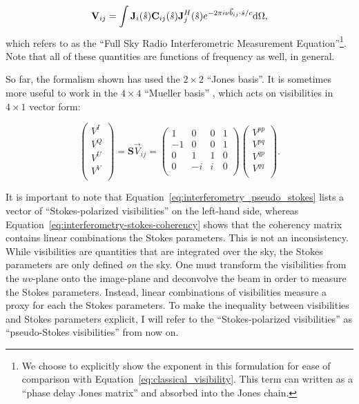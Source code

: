 \begin{equation}
\textbf{V}_{ij} = \int \textbf{J}_i(\hat{s}) \textbf{C}_{ij}(\hat{s}) \textbf{J}_j^H(\hat{s}) e^{-2\pi i \nu \vec{b}_{ij}\cdot\hat{s}/c} {\rm d}\Omega,
\label{eq:RIME}
\end{equation}
which \cite{Smirnov.11} refers to as the ``Full Sky Radio Interferometric Measurement Equation''\footnote{We choose to explicitly show the exponent in this formulation for ease of comparison with Equation~\ref{eq:classical_visibility}. This term can written as a ``phase delay Jones matrix'' and absorbed into the Jones chain.}. Note that all of these quantities are functions of frequency as well, in general.

So far, the formalism shown has used the $2\times 2$ ``Jones basis''. It is sometimes more useful to work in the $4\times 4$ ``Mueller basis'' \citep{Mueller.48}, which acts on visibilities in $4\times 1$ vector form:

\begin{equation}
\begin{pmatrix}
V^I \\
V^Q \\
V^U \\
V^V \\
\end{pmatrix}
=
\textbf{S}\vec{V}_{ij}
= 
\begin{pmatrix}
1 & 0 & 0 & 1 \\
-1 & 0 & 0 & 1\\
0 & 1 & 1 & 0 \\
0 & -i & i & 0 \\
\end{pmatrix}
\begin{pmatrix}
V^{pp} \\
V^{pq} \\
V^{qp} \\
V^{qq} \\
\end{pmatrix}.
\label{eq:interferometry_pseudo_stokes}
\end{equation} 

It is important to note that Equation~\ref{eq:interferometry_pseudo_stokes} lists a vector of ``Stokes-polarized visibilities'' on the left-hand side, whereas  Equation~\ref{eq:interferometry-stokes-coherency} shows that the coherency matrix contains linear combinations the Stokes parameters. This is not an inconsistency. While visibilities are quantities that are integrated over the sky, the Stokes parameters are only defined \textit{on} the sky. One must transform the visibilities from the $uv$-plane onto the image-plane and deconvolve the beam in order to measure the Stokes parameters. Instead, linear combinations of visibilities measure a proxy for each the Stokes parameters. To make the inequality between visibilities and Stokes parameters explicit, I will refer to the ``Stokes-polarized visibilities'' as ``pseudo-Stokes visibilities'' from now on.

